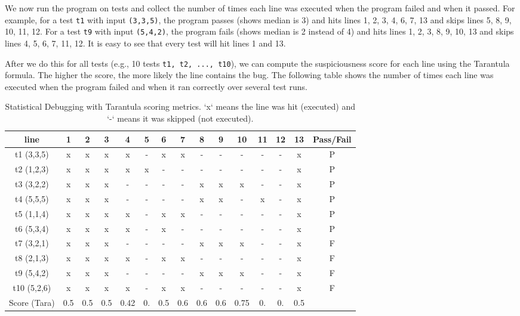 \documentclass[oneside,11pt,dvipsnames]{book}
\newcommand{\code}[1]{\texttt{#1}}
\begin{document}
We now run the program on tests and collect the number of times each line was executed when the program failed and when it passed. 
For example, for a test \code{t1} with input \code{(3,3,5)}, the program passes (shows median is 3) and hits lines 1, 2, 3, 4, 6, 7, 13 and skips lines 5, 8, 9, 10, 11, 12. For a test \code{t9} with input \code{(5,4,2)}, the program fails (shows median is 2 instead of 4) and hits lines 1, 2, 3, 8, 9, 10, 13 and skips lines 4, 5, 6, 7, 11, 12. It is easy to see that every test will hit lines 1 and 13.  

After we do this for all tests (e.g., 10 tests \code{t1, t2, ..., t10}), we can compute the suspiciousness score for each line using the Tarantula formula. The higher the score, the more likely the line contains the bug.  The following table shows the number of times each line was executed when the program failed and when it ran correctly over several test runs. 
\begin{table}
    \caption{Statistical Debugging with Tarantula scoring metrics. `x` means the line was hit (executed) and `-` means it was skipped (not executed).}\label{tab:sd}
    \centering
    \scriptsize
    \begin{tabular}{c|c|c|c|c|c|c|c|c|c|c|c|c|c|c}
    \toprule
    line & 1 & 2 & 3 & 4 & 5 & 6 & 7 & 8 & 9 & 10 & 11 & 12 & 13 & Pass/Fail\\
    \midrule
    t1 (3,3,5)  & x & x & x & x & - & x & x & - & - & - & - & - & x & P\\
    t2 (1,2,3)  & x & x & x & x & x & - & - & - & - & - & - & - & x & P\\
    t3 (3,2,2)  & x & x & x & - & - & - & - & x & x & x & - & - & x & P\\
    t4 (5,5,5)  & x & x & x & - & - & - & - & x & x & - & x & - & x & P\\
    t5 (1,1,4)  & x & x & x & x & - & x & x & - & - & - & - & - & x & P\\
    t6 (5,3,4)  & x & x & x & x & - & x & - & - & - & - & - & - & x & P\\
    t7 (3,2,1)  & x & x & x & - & - & - & - & x & x & x & - & - & x & F\\
    t8 (2,1,3)  & x & x & x & x & - & x & x & - & - & - & - & - & x & F\\
    t9 (5,4,2)  & x & x & x & - & - & - & - & x & x & x & - & - & x & F\\
    t10 (5,2,6) & x & x & x & x & - & x & x & - & - & - & - & - & x & F\\
    \midrule
    Score (Tara)       & 0.5 & 0.5 & 0.5 & 0.42 & 0. & 0.5 & 0.6 & 0.6 & 0.6 & 0.75 & 0. & 0. & 0.5\\
    \bottomrule
    \end{tabular}
\end{table}
\end{document}
